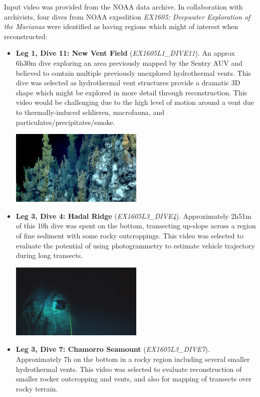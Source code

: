 \documentclass[letterpaper,12pt]{article}
\begin{document}
Input video was provided from the NOAA data archive.  In collaboration with archivists, four dives from NOAA expedition \textit{EX1605: Deepwater Exploration of the Marianas} were identified as having regions which might of interest when reconstructed:

\begin{itemize}
    \item \textbf{Leg 1, Dive 11: New Vent Field} (\textit{EX1605L1\_DIVE11}).   An approx 6h30m dive exploring an area previously mapped by the Sentry AUV and believed to contain multiple previously unexplored hydrothermal vents. This dive was selected as hydrothermal vent structures provide a dramatic 3D shape which might be explored in more detail through reconstruction.    This video would be challenging due to the high level of motion around a vent due to thermally-induced schlieren, macrofauna, and particulates/precipitates/smoke.
    
    \includegraphics[width=0.5\textwidth]{images/EX1605L1_DIVE11_highlight.jpg}
    
    \item \textbf{Leg 3, Dive 4: Hadal Ridge} (\textit{EX1605L3\_DIVE4}).  Approximately 2h51m of this 10h dive was spent on the bottom, transecting up-slope across a region of fine sediment with some rocky outcroppings.  This video was selected to evaluate the potential of using photogrammetry to estimate vehicle trajectory during long transects.
    
    \includegraphics[width=0.5\textwidth]{images/EX1605L3_DIVE4_highlight.jpg}
    
    \item \textbf{Leg 3, Dive 7: Chamorro Seamount} (\textit{EX1605L3\_DIVE7}).  Approximately 7h on the bottom in a rocky region including several smaller hydrothermal vents.    This video was selected to evaluate reconstruction of smaller rocker outcropping and vents, and also for mapping of transects over rocky terrain.
    

\end{itemize}
\end{document}
